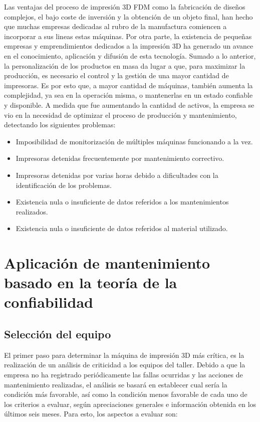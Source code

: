 Las ventajas del proceso de impresión 3D FDM como la fabricación de diseños complejos, el bajo coste de inversión y la obtención de un objeto final, han hecho que muchas empresas dedicadas al rubro de la manufactura comiencen a incorporar a sus lineas estas máquinas. Por otra parte, la existencia de pequeñas empresas y emprendimientos dedicados a la impresión 3D ha generado un avance en el conocimiento, aplicación y difusión de esta tecnología. Sumado a lo anterior, la personalización de los productos en masa da lugar a que, para maximizar la producción, es necesario el control y la gestión de una mayor cantidad de impresoras. Es por esto que, a mayor cantidad de máquinas, también aumenta la complejidad, ya sea en la operación misma, o mantenerlas en un estado confiable y disponible. A medida que fue aumentando la cantidad de activos, la empresa se vio en la necesidad de optimizar el proceso de producción y mantenimiento, detectando los siguientes problemas:

\begin{itemize}
\item Imposibilidad de monitorización de múltiples máquinas funcionando a la vez.
\item Impresoras detenidas frecuentemente por mantenimiento correctivo.
\item Impresoras detenidas por varias horas debido a dificultades con la identificación de los problemas.
\item Existencia nula o insuficiente de datos referidos a los mantenimientos realizados.
\item Existencia nula o insuficiente de datos referidos al material utilizado.
\end{itemize}





\section{ Aplicación de mantenimiento basado en la teoría de la confiabilidad}


\subsection{Selección del equipo}

El primer paso para determinar la máquina de impresión 3D más crítica, es la realización de un análisis de criticidad a los equipos del taller. Debido a que la empresa no ha registrado periódicamente las fallas ocurridas y las acciones de mantenimiento realizadas, el análisis se basará en establecer cual sería la condición más favorable, así como la condición menos favorable de cada uno de los criterios a evaluar, según apreciaciones generales e información obtenida en los últimos seis meses. Para esto, los aspectos a evaluar son:

